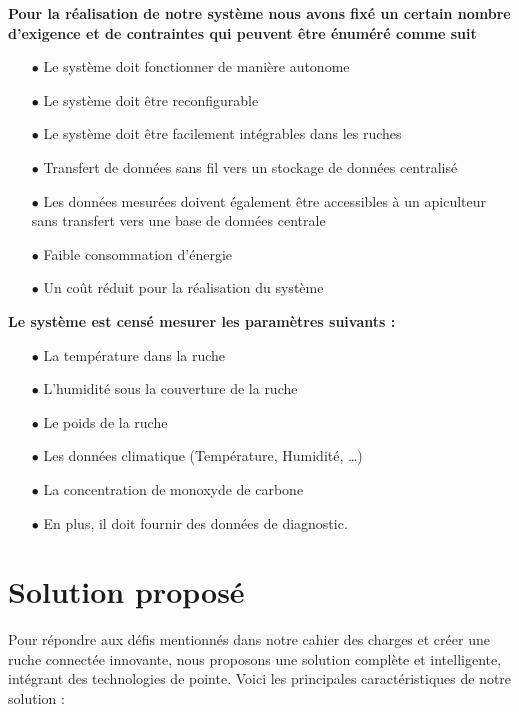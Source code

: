 \documentclass[a4paper,12pt]{report}
\begin{document}
	\textbf{Pour la réalisation de notre système nous avons fixé un certain nombre d’exigence et de contraintes qui peuvent être énuméré comme suit }
	
	\begin{itemize}
		\item [$\bullet$] Le système doit fonctionner de manière autonome  
		\item [$\bullet$] Le système doit être reconfigurable 
		\item [$\bullet$]Le système doit être facilement intégrables dans les ruches 
		\item [$\bullet$]Transfert de données sans fil vers un stockage de données centralisé 
		\item [$\bullet$] Les données mesurées doivent également être accessibles à un apiculteur sans transfert vers une base de données centrale 
		\item [$\bullet$] Faible consommation d'énergie 
		
		\item [$\bullet$]Un coût réduit pour la réalisation du système
	\end{itemize}
	\textbf{Le système est censé mesurer les paramètres suivants :}
	\begin{itemize}
		\item  [$\bullet$] La température dans la ruche 
		\item [$\bullet$] L’humidité sous la couverture de la ruche 
		\item [$\bullet$] Le poids de la ruche 
		\item [$\bullet$] Les données climatique (Température, Humidité, …) 
		\item [$\bullet$] La concentration de monoxyde de carbone 
		\item [$\bullet$] En plus, il doit fournir des données de diagnostic.
	\end{itemize}
	
\section*{Solution proposé}	
Pour répondre aux défis mentionnés dans notre cahier des charges et créer une ruche connectée innovante, nous proposons une solution complète et intelligente, intégrant des technologies de pointe. Voici les principales caractéristiques de notre solution :
\end{document}

